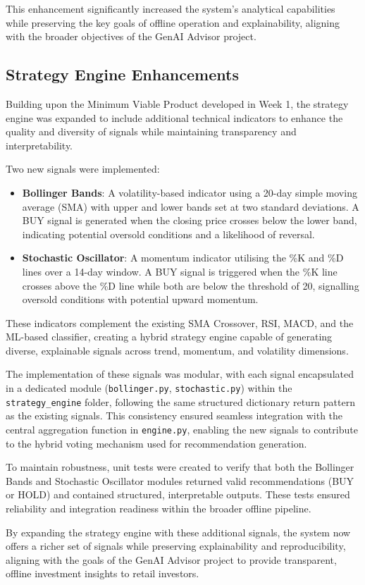 This enhancement significantly increased the system's analytical capabilities while preserving the key goals of offline operation and explainability, aligning with the broader objectives of the GenAI Advisor project.

\subsection{Strategy Engine Enhancements}

Building upon the Minimum Viable Product developed in Week 1, the strategy engine was expanded to include additional technical indicators to enhance the quality and diversity of signals while maintaining transparency and interpretability. 

Two new signals were implemented:

\begin{itemize}
    \item \textbf{Bollinger Bands}: A volatility-based indicator using a 20-day simple moving average (SMA) with upper and lower bands set at two standard deviations. A BUY signal is generated when the closing price crosses below the lower band, indicating potential oversold conditions and a likelihood of reversal.
    \item \textbf{Stochastic Oscillator}: A momentum indicator utilising the \%K and \%D lines over a 14-day window. A BUY signal is triggered when the \%K line crosses above the \%D line while both are below the threshold of 20, signalling oversold conditions with potential upward momentum.
\end{itemize}

These indicators complement the existing SMA Crossover, RSI, MACD, and the ML-based classifier, creating a hybrid strategy engine capable of generating diverse, explainable signals across trend, momentum, and volatility dimensions.

The implementation of these signals was modular, with each signal encapsulated in a dedicated module (\texttt{bollinger.py}, \texttt{stochastic.py}) within the \texttt{strategy\_engine} folder, following the same structured dictionary return pattern as the existing signals. This consistency ensured seamless integration with the central aggregation function in \texttt{engine.py}, enabling the new signals to contribute to the hybrid voting mechanism used for recommendation generation.

To maintain robustness, unit tests were created to verify that both the Bollinger Bands and Stochastic Oscillator modules returned valid recommendations (BUY or HOLD) and contained structured, interpretable outputs. These tests ensured reliability and integration readiness within the broader offline pipeline.

By expanding the strategy engine with these additional signals, the system now offers a richer set of signals while preserving explainability and reproducibility, aligning with the goals of the GenAI Advisor project to provide transparent, offline investment insights to retail investors.
